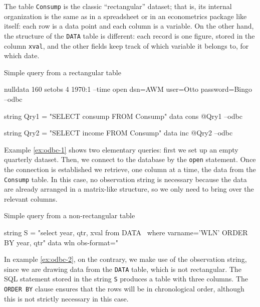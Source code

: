The table \texttt{Consump} is the classic ``rectangular'' dataset;
that is, its internal organization is the same as in a spreadsheet or
in an econometrics package like  itself: each row is a data
point and each column is a variable. On the other hand, the structure
of the \texttt{DATA} table is different: each record is one figure,
stored in the column \texttt{xval}, and the other fields keep track of
which variable it belongs to, for which date.

\begin{script}[htbp]
  \caption{Simple query from a rectangular table}
  \label{ex:odbc-1}
\begin{scode}
nulldata 160
setobs 4 1970:1 --time
open dsn=AWM user=Otto password=Bingo --odbc

string Qry1 = "SELECT consump FROM Consump"
data cons @Qry1 --odbc

string Qry2 = "SELECT income FROM Consump"
data inc @Qry2 --odbc
\end{scode}
\end{script}

Example \ref{ex:odbc-1} shows two elementary queries: first we set up
an empty quarterly dataset. Then, we connect to the database by the
\texttt{open} statement. Once the connection is established we
retrieve, one column at a time, the data from the \texttt{Consump}
table. In this case, no observation string is necessary because the
data are already arranged in a matrix-like structure, so we only need
to bring over the relevant columns.

\begin{script}[htbp]
  \caption{Simple query from a non-rectangular table}
  \label{ex:odbc-2}
\begin{scode}
string S = "select year, qtr, xval from DATA \
       where varname='WLN' ORDER BY year, qtr"
data wln obs-format="%
\end{scode}
\end{script}

In example \ref{ex:odbc-2}, on the contrary, we make use of the
observation string, since we are drawing data from the \texttt{DATA}
table, which is not rectangular. The SQL statement stored in the
string \texttt{S} produces a table with three columns. The
\texttt{ORDER BY} clause ensures that the rows will be in
chronological order, although this is not strictly necessary in this
case.

